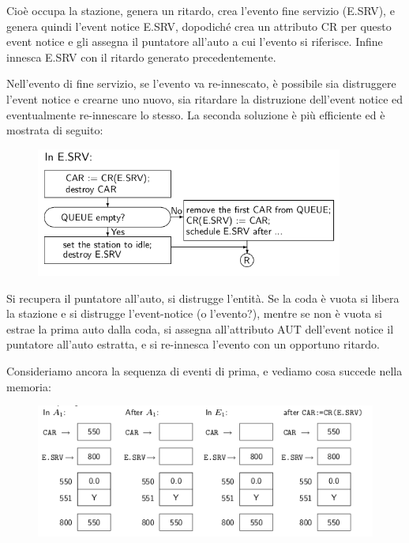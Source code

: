 \documentclass[11pt]{book}
\begin{document}
Cio\`e occupa la stazione, genera un ritardo, crea l'evento fine
servizio (E.SRV), e genera quindi l'event notice E.SRV, dopodich\'e
crea un attributo CR per questo event notice e gli assegna il
puntatore all'auto a cui l'evento si riferisce. Infine innesca E.SRV
con il ritardo generato precedentemente.

Nell'evento di fine servizio, se l'evento va re-innescato, \`e
possibile sia distruggere l'event notice e crearne uno nuovo, sia
ritardare la distruzione dell'event notice ed eventualmente
re-innescare lo stesso. La seconda soluzione \`e pi\`u efficiente ed \`e
mostrata di seguito:

\begin{figure}[H]
  \centering
  \includegraphics[width=0.9\textwidth]{images/cap11fig35.png}
\end{figure}

Si recupera il puntatore all'auto, si distrugge l'entit\`a. Se la coda
\`e vuota si libera la stazione e si distrugge l'event-notice (o
l'evento?), mentre se non \`e vuota si estrae la prima auto dalla coda,
si assegna all'attributo AUT dell'event notice il puntatore all'auto
estratta, e si re-innesca l'evento con un opportuno ritardo.

Consideriamo ancora la sequenza di eventi di prima, e vediamo cosa
succede nella memoria:

\begin{figure}[H]
  \centering
  \includegraphics[width=\textwidth]{images/cap11fig36.png}
\end{figure}
\end{document}
